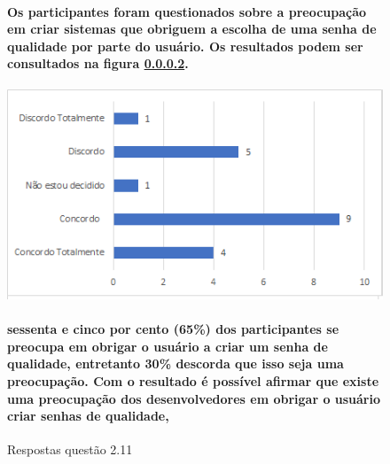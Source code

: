 \begin{figure}[!t]
\centering
\paragraph{Os participantes foram questionados sobre a preocupação em criar sistemas que obriguem a escolha de uma senha de qualidade por parte do usuário. Os resultados podem ser consultados na figura \ref{fig:2.11}. }

\includegraphics[scale=0.7]{figuras das questoes/2.11.png}
\caption{Respostas questão 2.11}

\paragraph{
sessenta e cinco por cento (65{\%}) dos participantes se preocupa em obrigar o usuário a criar um senha de qualidade, entretanto 30{\%} descorda que  isso seja uma preocupação. Com o resultado é possível afirmar que existe uma preocupação dos desenvolvedores em obrigar o usuário criar senhas de qualidade,  
}

\label{fig:2.11}
\end{figure}


